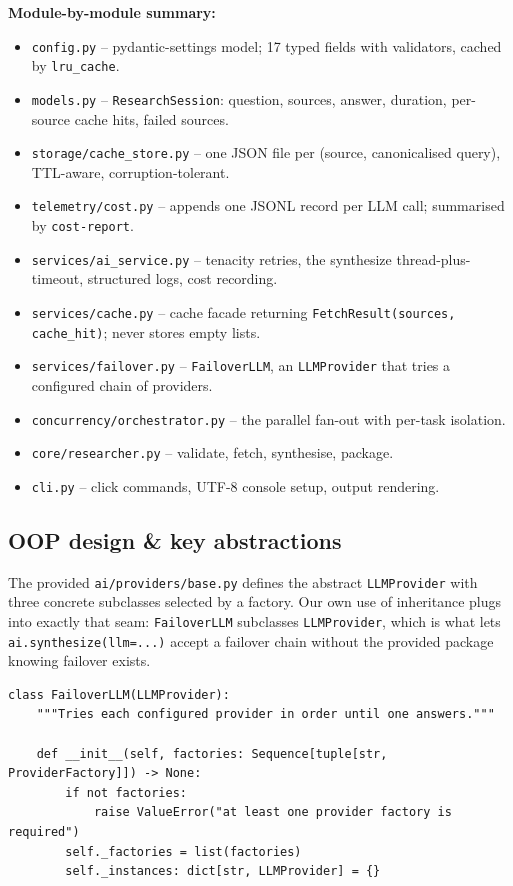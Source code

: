 \documentclass[11pt,a4paper]{article}
\begin{document}
\textbf{Module-by-module summary:}
\begin{itemize}[topsep=2pt,itemsep=1pt]
  \item \texttt{config.py} -- pydantic-settings model; 17 typed fields with validators, cached by \texttt{lru\_cache}.
  \item \texttt{models.py} -- \texttt{ResearchSession}: question, sources, answer, duration, per-source cache hits, failed sources.
  \item \texttt{storage/cache\_store.py} -- one JSON file per (source, canonicalised query), TTL-aware, corruption-tolerant.
  \item \texttt{telemetry/cost.py} -- appends one JSONL record per LLM call; summarised by \texttt{cost-report}.
  \item \texttt{services/ai\_service.py} -- tenacity retries, the synthesize thread-plus-timeout, structured logs, cost recording.
  \item \texttt{services/cache.py} -- cache facade returning \texttt{FetchResult(sources, cache\_hit)}; never stores empty lists.
  \item \texttt{services/failover.py} -- \texttt{FailoverLLM}, an \texttt{LLMProvider} that tries a configured chain of providers.
  \item \texttt{concurrency/orchestrator.py} -- the parallel fan-out with per-task isolation.
  \item \texttt{core/researcher.py} -- validate, fetch, synthesise, package.
  \item \texttt{cli.py} -- click commands, UTF-8 console setup, output rendering.
\end{itemize}

\subsection{OOP design \& key abstractions}

The provided \texttt{ai/providers/base.py} defines the abstract \texttt{LLMProvider} with three concrete subclasses selected by a factory. Our own use of inheritance plugs into exactly that seam: \texttt{FailoverLLM} subclasses \texttt{LLMProvider}, which is what lets \texttt{ai.synthesize(llm=...)} accept a failover chain without the provided package knowing failover exists.

\begin{lstlisting}[style=python,firstnumber=1]
class FailoverLLM(LLMProvider):
    """Tries each configured provider in order until one answers."""

    def __init__(self, factories: Sequence[tuple[str, ProviderFactory]]) -> None:
        if not factories:
            raise ValueError("at least one provider factory is required")
        self._factories = list(factories)
        self._instances: dict[str, LLMProvider] = {}
\end{lstlisting}
\end{document}
